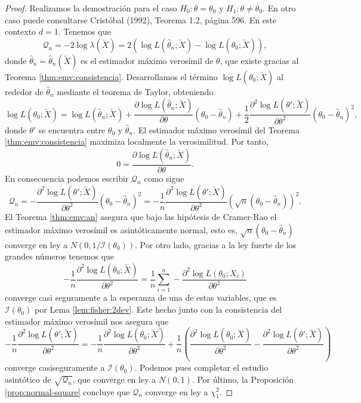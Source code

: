         \begin{proof}
            Realizamos la demostración para el caso $H_0: \theta = \theta_0$ y $H_1: \theta \ne \theta_0$. En otro caso puede consultarse Cristóbal (1992), Teorema 1.2, página 596. En este contexto $d = 1$. Tenemos que
            \[\mathcal{Q}_n = -2 \log \lambda(\utilde{X}) = 2 (\log L(\hat{\theta}_n; \utilde{X}) - \log L(\theta_0; \utilde{X})),\]
            donde $\hat{\theta}_n = \hat{\theta}_n(\utilde{X})$ es el estimador máximo verosímil de $\theta$, que existe gracias al Teorema \ref{thm:emv:consistencia}. Desarrollamos el término $\log L(\theta_0; \utilde{X})$ al rededor de $\hat{\theta}_n$ mediante el teorema de Taylor, obteniendo
            \[\log L(\theta_0; \utilde{X}) = \log L(\hat{\theta}_n; \utilde{X}) + \frac{\partial \log L(\hat{\theta}_n; \utilde{X})}{\partial \theta}(\theta_0 -  \hat{\theta}_n) + \frac{1}{2} \frac{\partial^2 \log L(\theta'; \utilde{X})}{\partial \theta^2}(\theta_0 -  \hat{\theta}_n)^2,\]
            donde $\theta'$ se encuentra entre $\theta_0$ y $\hat{\theta}_n$. El estimador máximo verosímil del Teorema \ref{thm:emv:consistencia} maximiza localmente la verosimilitud. Por tanto,
            \[0 = \frac{\partial \log L(\hat{\theta}_n; \utilde{X})}{\partial \theta}.\]
            En consecuencia podemos escribir $\mathcal{Q}_n$ como sigue
            \[\mathcal{Q}_n = - \frac{\partial^2 \log L(\theta'; \utilde{X})}{\partial \theta^2}(\theta_0 -  \hat{\theta}_n)^2 = - \frac{1}{n} \frac{\partial^2 \log L(\theta'; \utilde{X})}{\partial \theta^2}(\sqrt{n}(\theta_0 -  \hat{\theta}_n))^2.\]
            El Teorema \ref{thm:emv:an} asegura que bajo las hipótesis de Cramer-Rao el estimador máximo verosímil es asintóticamente normal, esto es, $\sqrt{n}(\theta_0 -  \hat{\theta}_n)$ converge en ley a $N(0, 1/\mathcal{I}(\theta_0))$. Por otro lado, gracias a la ley fuerte de los grandes números tenemos que
            \[- \frac{1}{n} \frac{\partial^2 \log L(\theta_0; \utilde{X})}{\partial \theta^2} = \frac{1}{n} \sum_{i = 1}^n - \frac{\partial^2 \log L(\theta_0; X_i)}{\partial \theta^2}\]
            converge casi seguramente a la esperanza de una de estas variables, que es $\mathcal{I}(\theta_0)$ por Lema \ref{lem:fisher:2dev}. Este hecho junto con la consistencia del estimador máximo verosímil nos asegura que
            \[- \frac{1}{n} \frac{\partial^2 \log L(\theta'; \utilde{X})}{\partial \theta^2} = - \frac{1}{n} \frac{\partial^2 \log L(\theta_0; \utilde{X})}{\partial \theta^2} + \frac{1}{n}\left(\frac{\partial^2 \log L(\theta_0; \utilde{X})}{\partial \theta^2} -  \frac{\partial^2 \log L(\theta'; \utilde{X})}{\partial \theta^2}\right)\]
            converge casiseguramente a $\mathcal{I}(\theta_0)$. Podemos pues completar el estudio asintótico de $\sqrt{\mathcal{Q}_n}$, que converge en ley a $N(0, 1)$. Por último, la Proposición \ref{prop:normal-square} concluye que $\mathcal{Q}_n$ converge en ley a $\chi_1^2$.
        \end{proof}

